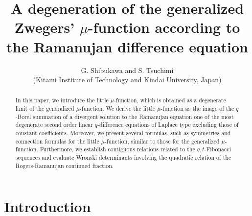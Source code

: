 \documentclass[a4paper]{article}
\numberwithin{equation}{section}
\theoremstyle{plain}
\begin{document}
\title{A degeneration of the generalized Zwegers' $\mu$-function according to the Ramanujan difference equation}
\author{G. Shibukawa and S. Tsuchimi\\
(Kitami Institute of Technology and Kindai University, Japan)}
\date{}

\maketitle

\begin{abstract}
In this paper, we introduce the little $\mu$-function, which is obtained as a degenerate limit of the generalized $\mu$-function. 
We derive the little $\mu$-function as the image of the $q$-Borel summation of a divergent solution to the Ramanujan equation one of the most degenerate second order linear $q$-difference equations of Laplace type excluding those of constant coefficients. 
Moreover, we present several formulas, such as symmetries and connection formulas for the little $\mu$-function, similar to those for the generalized $\mu$-function. 
Furthermore, we establish contiguous relations related to the $q,t$-Fibonacci sequences and evaluate Wronski determinants involving the quadratic relation of the Rogers-Ramanujan continued fraction. 
\end{abstract}

\section{Introduction}
\end{document}
